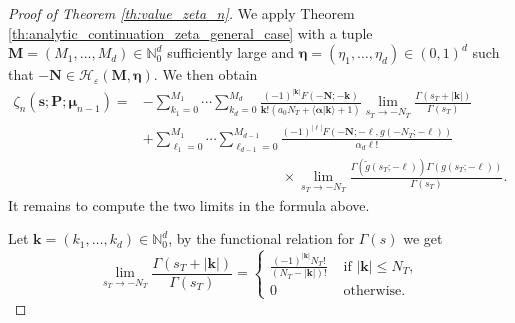 \documentclass[10pt,a4paper]{amsart}
\begin{document}
\begin{proof}[Proof of Theorem \ref{th:value_zeta_n}]
We apply Theorem \ref{th:analytic_continuation_zeta_general_case} with a tuple $\mathbf{M}=(M_1,\ldots,M_d)\in \mathbb{N}_0^d$ sufficiently large and $\boldsymbol{\eta}=(\eta_1,\ldots,\eta_d) \in (0,1)^d$ such that $-\mathbf{N} \in \mathcal{H}_{\varepsilon}(\mathbf{M},\boldsymbol{\eta})$. We then obtain
\begin{align*}
    \zeta_{n}(\mathbf{s};\mathbf{P};\boldsymbol{\mu}_{n-1})=& -\sum_{k_1=0}^{M_1} \cdots \sum_{k_d=0}^{M_d}  \frac{(-1)^{|\mathbf{k}|}F(-\mathbf{N};-\mathbf{k})}{\mathbf{k}!(a_0N_T+\langle \boldsymbol{\alpha}|\mathbf{k}\rangle+1)}\lim_{s_T \to -N_T}\frac{\Gamma(s_T+|\mathbf{k}|)}{\Gamma(s_T)} \\ 
    & +\sum_{\ell_1=0}^{M_1} \cdots \sum_{\ell_{d-1}=0}^{M_{d-1}} \frac{(-1)^{|\boldsymbol{\ell}|}F(-\mathbf{N};-\boldsymbol{\ell},g(-N_T;-\boldsymbol{\ell}))}{\alpha_d\boldsymbol{\ell}!} \\
    & \hspace{119pt} \times \lim_{s_T \to -N_T}\frac{\Gamma(\widetilde{g}(s_T;-\boldsymbol{\ell}))\Gamma(g(s_T;-\boldsymbol{\ell}))}{\Gamma(s_T)}.
\end{align*} 
It remains to compute the two limits in the formula above.

Let $\mathbf{k}=(k_1,\ldots,k_d) \in \mathbb{N}_0^d$, by the functional relation for $\Gamma(s)$ we get
\[
    \lim_{s_T \to -N_T} \frac{\Gamma(s_T+|\mathbf{k}|)}{\Gamma(s_T)} =
    \begin{cases}
        \frac{(-1)^{|\mathbf{k}|}N_T!}{(N_T-|\mathbf{k}|)!} & \text{ if } |\mathbf{k}| \leq N_T, \\
        0 &\text{ otherwise.}
    \end{cases}
\]


\end{proof}
\end{document}
